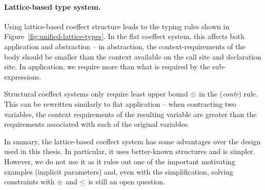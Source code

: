 
\paragraph{Lattice-based type system.}

Using lattice-based coeffect structure leads to the typing rules shown in Figure~\ref{fig:unified-lattice-types}.
In the flat coeffect system, this affects both application and abstraction -- in abstraction,
the context-requirements of the body should be smaller than the context available on the 
call site and declaration site. In application, we require more than what is required by
the sub-expressions.

Structural coeffect systems only require least upper bound $\cpar$ in the (\emph{contr}) rule.
This can be rewritten similarly to flat application --  when contracting two variables, the
context requirements of the resulting variable are greater than the requirements associated with
each of the original variables.

In smmary, the lattice-based coeffect system has some advantages over the design used in this
thesis. In particular, it uses better-known structures and is simpler. However, we do not use
it as it rules out one of the important motivating examples (implicit parameters) and, even with
the simplification, solving constraints with $\cseq$ and $\cleq$ is still an open question.


%                                                                             
%                                                                             

